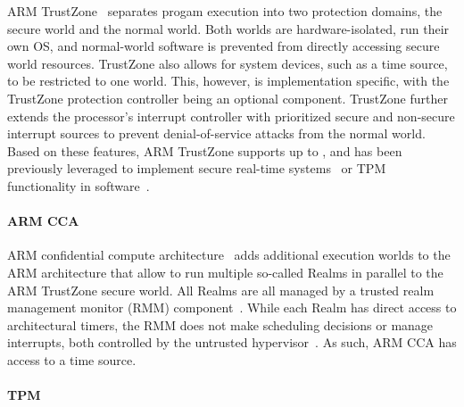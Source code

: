 \documentclass[sigplan,10pt]{acmart}
\begin{document}
ARM TrustZone~\cite{pinto2019demystifyingtz} separates progam execution into two
protection domains, the secure world and the normal world. Both worlds are
hardware-isolated, run their own OS, and normal-world software is prevented from
directly accessing secure world resources. TrustZone also allows for system
devices, such as a time source, to be restricted to one world. This, however, is
implementation specific, with the TrustZone protection controller being
an optional component. TrustZone further extends the processor's interrupt
controller with prioritized secure and non-secure interrupt sources to prevent
denial-of-service attacks from the normal world. Based on these features, ARM
TrustZone supports up to \Tfour{}, and has been previously leveraged to
implement secure real-time systems~\cite{wang2022rttee} or TPM functionality in
software~\cite{raj2016ftpm}.

\paragraph{ARM CCA}
ARM confidential compute architecture~\cite{arm-cca} adds additional execution
worlds to the ARM architecture that allow to run multiple so-called Realms in
parallel to the ARM TrustZone secure world. All Realms are all managed by a
trusted realm management monitor (RMM) component~\cite{arm-rmm}. While each
Realm has direct access to architectural timers, the RMM does not make
scheduling decisions or manage interrupts, both controlled by the untrusted
hypervisor~\cite{arm-cca}. As such, ARM CCA has access to a \Tthree{} time
source.

\paragraph{TPM}
\end{document}
